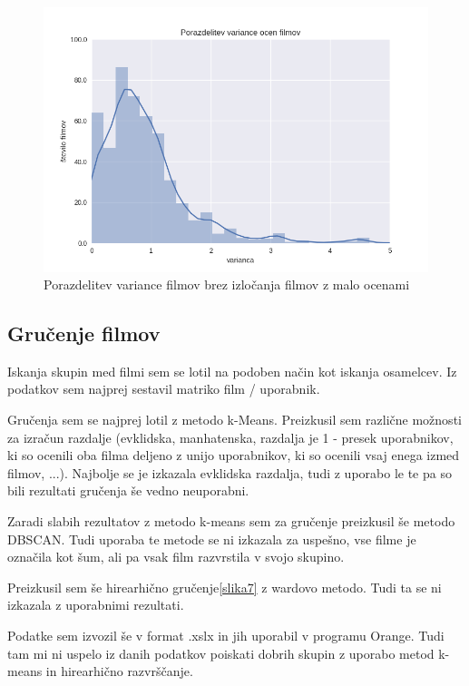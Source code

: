 \documentclass[a4paper,11pt]{article}
\begin{document}
\begin{figure}[htbp]
\begin{center}
\includegraphics[scale=0.7]{porazdelitevPrva.png}
\caption{Porazdelitev variance filmov brez izločanja filmov z malo ocenami}
\label{slika1}
\end{center}
\end{figure}

\subsection{Gručenje filmov}
Iskanja skupin med filmi sem se lotil na podoben način kot iskanja osamelcev. Iz podatkov sem najprej sestavil matriko
film / uporabnik.

Gručenja sem se najprej lotil z metodo k-Means. Preizkusil sem različne možnosti za izračun razdalje (evklidska, manhatenska, razdalja je 1 - presek uporabnikov, ki so ocenili oba filma deljeno z unijo uporabnikov, ki so ocenili vsaj enega izmed filmov, ...). Najbolje se je izkazala evklidska razdalja, tudi z uporabo le te pa so bili rezultati gručenja še vedno neuporabni.

Zaradi slabih rezultatov z metodo k-means sem za gručenje preizkusil še metodo DBSCAN. Tudi uporaba te metode se ni izkazala za uspešno, vse filme je označila kot šum, ali pa vsak film razvrstila v svojo skupino.

Preizkusil sem še hirearhično gručenje\ref{slika7} z wardovo metodo. Tudi ta se ni izkazala z uporabnimi rezultati.

Podatke sem izvozil še v format .xslx in jih uporabil v programu Orange. Tudi tam mi ni uspelo iz danih podatkov poiskati dobrih skupin z uporabo metod k-means in hirearhično razvrščanje.
\end{document}
